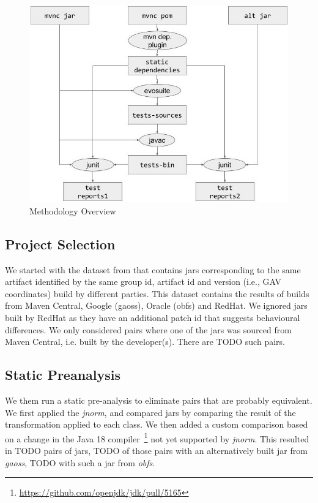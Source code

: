 \documentclass[conference]{IEEEtran}
\begin{document}
\begin{figure}[ht!]
	\centering
	\includegraphics[width=\columnwidth]{methodology.jpg}
	\caption{Methodology Overview \label{fig:methodology}}
\end{figure}


\subsection{Project Selection}

We started with the dataset from \cite{dietrich2024levelsbinaryequivalencecomparison} that contains jars corresponding to the same artifact identified by the same group id, artifact id and version (i.e., GAV coordinates) build by different parties. This dataset contains the results of builds from Maven Central, Google (gaoss), Oracle (obfs) and  RedHat. We ignored jars built by RedHat as they have an additional patch id that suggests behavioural differences.  We only considered pairs where one of the jars was sourced from Maven Central, i.e. built by the developer(s). There are TODO such pairs.


\subsection{Static Preanalysis}

We them run a static pre-analysis to eliminate pairs that are probably equivalent. We first applied the \textit{jnorm}, and compared jars by comparing the result of the transformation applied to each class. We then added a custom comparison based on a change in the Java 18 compiler~\footnote{\url{https://github.com/openjdk/jdk/pull/5165}} not yet supported by \textit{jnorm}. This resulted in TODO pairs of jars, TODO of those pairs with an alternatively built jar from \textit{gaoss}, TODO with such a jar from \textit{obfs}.
\end{document}
